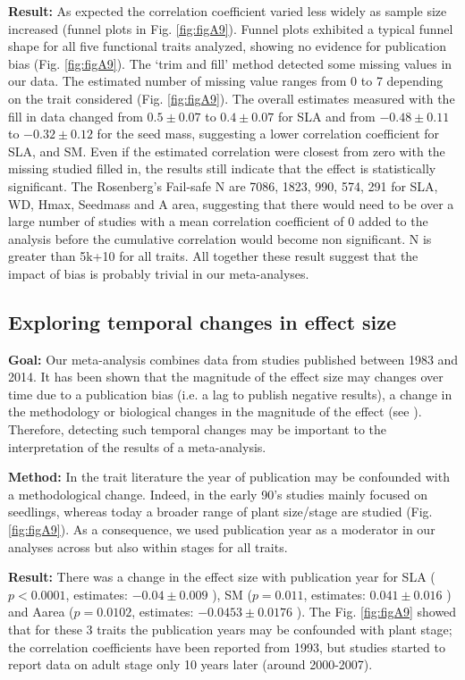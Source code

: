 \documentclass[a4paper,11pt]{article}
\begin{document}
\begin{appendices}
\textbf{Result:} As expected the correlation coefficient varied less widely as sample size increased (funnel plots in Fig. \ref{fig:figA9}). Funnel plots exhibited a typical funnel shape for all five functional traits analyzed, showing no evidence for publication bias (Fig. \ref{fig:figA9}).
The ‘trim and fill’ method detected some missing values in our data. The estimated number of missing value ranges from 0 to 7 depending on the trait considered (Fig. \ref{fig:figA9}). The overall estimates measured with the fill in data changed from $0.5 \pm 0.07$  to $0.4 \pm 0.07$  for SLA and from $-0.48 \pm 0.11$  to $-0.32 \pm 0.12$  for the seed mass, suggesting a lower correlation coefficient for SLA, and SM. Even if the estimated correlation were closest from zero with the missing studied filled in, the results still indicate that the effect is statistically significant.
The Rosenberg’s Fail-safe N are 7086, 1823, 990, 574, 291 for SLA, WD, Hmax, Seedmass and A area, suggesting that there would need to be over a large number of studies with a mean correlation coefficient of 0 added to the analysis before the cumulative correlation would become non significant. N is greater than 5k+10 for all traits.
All together these result suggest that the impact of bias is probably trivial in our meta-analyses.

\subsection{Exploring temporal changes in effect size}
\textbf{Goal:} Our meta-analysis combines data from studies published between 1983 and 2014. It has been shown that the magnitude of the effect size may changes over time due to a publication bias (i.e. a lag to publish negative results), a change in the methodology or biological changes in the magnitude of the effect (see \citealt{Koricheva:2013hy}). Therefore, detecting such temporal changes may be important to the interpretation of the results of a meta-analysis.

\textbf{Method:} In the trait literature the year of publication may be confounded with a methodological change. Indeed, in the early 90’s studies mainly focused on seedlings, whereas today a broader range of plant size/stage are studied (Fig. \ref{fig:figA9}). As a consequence, we used publication year as a moderator in our analyses \citep{Zvereva:2008jm} across but also within stages for all traits.  

\textbf{Result:} There was a change in the effect size with publication year for SLA ($p<0.0001$, estimates: $-0.04 \pm 0.009$ ), SM ($p = 0.011$, estimates: $0.041 \pm 0.016$ ) and Aarea ($p = 0.0102$, estimates: $-0.0453 \pm 0.0176$ ). The Fig. \ref{fig:figA9} showed that for these 3 traits the publication years may be confounded with plant stage; the correlation coefficients have been reported from 1993, but studies started to report data on adult stage only 10 years later (around 2000-2007).


\end{appendices}
\end{document}
